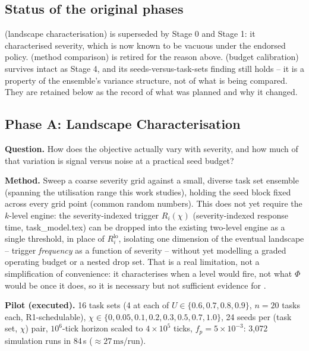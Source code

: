 \subsection{Status of the original phases}

 (landscape characterisation) is superseded by Stage 0 and
Stage 1: it characterised severity, which is now known to be vacuous under the
endorsed policy.  (method comparison) is retired for the
reason above.  (budget calibration) survives intact as
Stage 4, and its seeds-versus-task-sets finding still holds -- it is a property
of the ensemble's variance structure, not of what is being compared. They are
retained below as the record of what was planned and why it changed.

\subsection{Phase A: Landscape Characterisation}
\label{sec:phase-a}

\textbf{Question.} How does the objective actually vary with severity, and
how much of that variation is signal versus noise at a practical seed
budget?

\textbf{Method.} Sweep a coarse severity grid against a small, diverse task
set ensemble (spanning the utilisation range this work studies), holding the
seed block fixed across every grid point (common random numbers). This does
not yet require the $k$-level engine: the severity-indexed trigger
$R_i(\chi)$ (severity-indexed response time, task\_model.tex) can be dropped
into the existing two-level engine as a single threshold, in place of
$R_i^{\mathrm{lo}}$, isolating one dimension of the eventual landscape --
trigger \emph{frequency} as a function of severity -- without yet modelling a
graded operating budget or a nested drop set. That is a real limitation, not
a simplification of convenience: it characterises when a level would fire,
not what $\Phi$ would be once it does, so it is necessary but not sufficient
evidence for .

\textbf{Pilot (executed).} 16 task sets (4 at each of $U \in \{0.6, 0.7, 0.8,
0.9\}$, $n=20$ tasks each, R1-schedulable), $\chi \in \{0, 0.05, 0.1, 0.2,
0.3, 0.5, 0.7, 1.0\}$, 24 seeds per (task set, $\chi$) pair, $10^6$-tick
horizon scaled to $4{\times}10^5$ ticks, $f_p = 5{\times}10^{-3}$: 3{,}072
simulation runs in 84\,s ($\approx 27\,\mathrm{ms}$/run).


